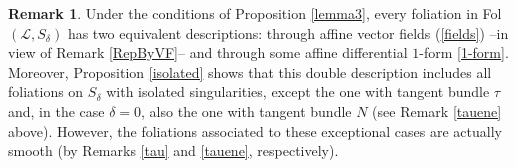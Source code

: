 \documentclass{amsart} %
\theoremstyle{definition}
\newtheorem{remark}[theorem]{Remark}
\newcommand{\mcL}{\mathcal{L}}
\newcommand{\mcO}{\mathcal{O}}
\begin{document}
 \begin{remark}\label{ShfofIds}
Under the conditions of Proposition \ref{lemma3}, every foliation in Fol$(\mcL,S_{\delta})$
 has two equivalent descriptions: through affine vector fields (\ref{fields}) --in view of Remark \ref{RepByVF}-- and through some affine differential
 $1$-form \eqref{1-form}. Moreover, Proposition \ref{isolated} shows that this double
 description includes all foliations on $S_{\delta}$ with isolated singularities, except the one with tangent
 bundle $ \tau $ and, in the case $\delta=0$, also the one with tangent bundle $ N $ (see Remark \ref{tauene}
 above). However, the foliations associated to these exceptional cases are actually smooth (by Remarks \ref{tau} and \ref{tauene}, respectively).


\end{remark}
\end{document}
